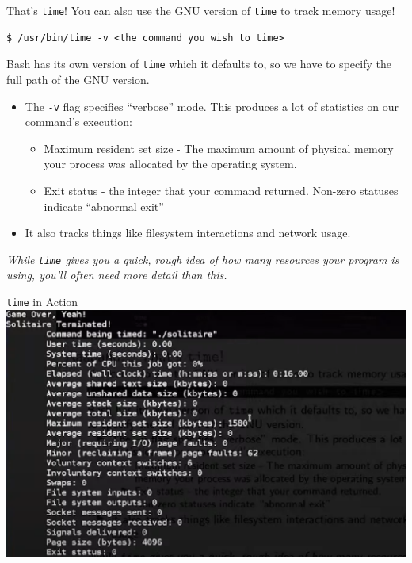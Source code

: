 \documentclass[11pt]{beamer}
\begin{document}
\begin{frame}[fragile=singleslide]{That's \texttt{time}!}
You can also use the GNU version of \texttt{time} to track memory usage! 
\begin{lstlisting}[style=terminal]
$ /usr/bin/time -v <the command you wish to time>
\end{lstlisting}
Bash has its own version of \texttt{time} which it defaults to, so we have to specify the full path of the GNU version.  
\begin{itemize}
\item The \texttt{-v} flag specifies ``verbose'' mode. This produces a lot of statistics on our command's execution:
\begin{itemize}
\item Maximum resident set size - The maximum amount of physical memory your process was allocated by the operating system.  
\item Exit status - the integer that your command returned.  Non-zero statuses indicate ``abnormal exit''
\end{itemize}
\item It also tracks things like filesystem interactions and network usage.  
\end{itemize}

\center
\emph{While \texttt{time} gives you a quick, rough idea of how many resources your program is using, you'll often need more detail than this.}
\end{frame}

\begin{frame}{\texttt{time} in Action}
\center
\includegraphics[scale=0.3]{time.png}
\end{frame}
\end{document}

